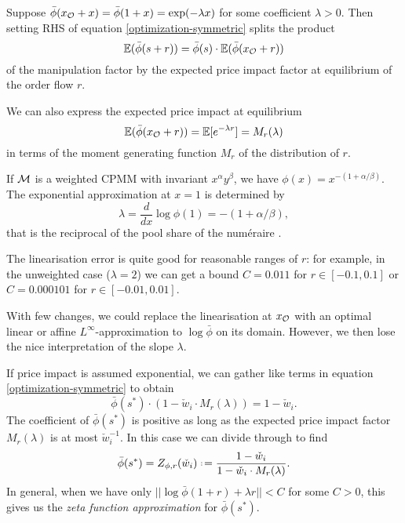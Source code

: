 \begin{definition}

  Suppose $\bar\phi(x_{\mathcal{O}} + x)=\bar\phi(1+x)=\exp(-\lambda x)$ for some coefficient $\lambda>0$.
  Then setting RHS of equation \eqref{optimization-symmetric} splits the product 
  \[
    \mathbb{E}(\bar\phi(s+r)) = \bar\phi(s)\cdot \mathbb{E}(\bar\phi(x_{\mathcal{O}} + r))
  \]
  of the manipulation factor by the expected price impact factor at equilibrium of the order flow $r$.

  We can also express the expected price impact at equilibrium
  \[
    \mathbb{E}(\bar\phi(x_{\mathcal{O}} + r)) = \mathbb{E}[e^{-\lambda r}] = M_r(\lambda)
  \]
  in terms of the moment generating function $M_r$ of the distribution of $r$.

\end{definition}

\begin{example}[CPMM]

  If $\mathcal{M}$ is a weighted CPMM with invariant $x^\alpha y^\beta$, we have $\phi(x)=x^{-(1+\alpha/\beta)}$.
  The exponential approximation at $x=1$ is determined by 
  \[
    \lambda = \frac{d}{dx}\log\phi(1) = -(1+\alpha/\beta),
  \]
  that is the reciprocal of the pool share of the num\'eraire \cite{martinelli2019non}.

  The linearisation error is quite good for reasonable ranges of $r$: for example, in the unweighted case ($\lambda=2$) we can get a bound $C=0.011$ for $r\in[-0.1,0.1]$ or $C=0.000101$ for $r\in[-0.01,0.01]$.
  
\end{example}

\begin{remark}

  With few changes, we could replace the linearisation at $x_{\mathcal{O}}$ with an optimal linear or affine $L^\infty$-approximation to $\log\bar\phi$ on its domain.
  However, we then lose the nice interpretation of the slope $\lambda$.

\end{remark}

If price impact is assumed exponential, we can gather like terms in equation \eqref{optimization-symmetric} to obtain
\[
  \bar\phi({s^*})\cdot\left(1-\check w_i \cdot M_r(\lambda)\right) = 1- \check w_i.
\]
The coefficient of $\bar\phi({s^*})$ is positive as long as the expected price impact factor $M_r(\lambda)$ is at most $\check w_i^{-1}$.
%
In this case we can divide through to find
\begin{equation} \label{exp-manipulation-factor}
  \bar\phi({s^*}) = Z_{\phi,r}(\check w_i) \defeq  \frac{ 1-\check w_i }{ 1-\check w_i\cdot M_r(\lambda) }.
\end{equation}
%
In general, when we have only $||\log\bar\phi(1+r) + \lambda r || < C$ for some $C>0$, this gives us the \emph{zeta function approximation} for $\bar\phi({s^*})$.

